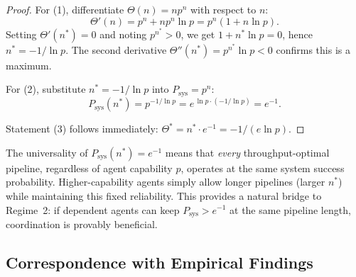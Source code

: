 \begin{proof}
For (1), differentiate $\Theta(n) = n p^n$ with respect to $n$:
\[
  \Theta'(n) = p^n + n p^n \ln p = p^n(1 + n \ln p).
\]
Setting $\Theta'(n^*) = 0$ and noting $p^{n^*} > 0$, we get $1 + n^* \ln p = 0$,
hence $n^* = -1/\ln p$. The second derivative $\Theta''(n^*) = p^{n^*} \ln p < 0$
confirms this is a maximum.

For (2), substitute $n^* = -1/\ln p$ into $P_{\mathrm{sys}} = p^n$:
\[
  P_{\mathrm{sys}}(n^*) = p^{-1/\ln p} = e^{\,\ln p \cdot (-1/\ln p)} = e^{-1}.
\]

Statement (3) follows immediately: $\Theta^* = n^* \cdot e^{-1} = -1/(e \ln p)$.
\end{proof}

\begin{remark}
The universality of $P_{\mathrm{sys}}(n^*) = e^{-1}$ means that \emph{every} throughput-optimal
pipeline, regardless of agent capability $p$, operates at the same system success probability.
Higher-capability agents simply allow longer pipelines (larger $n^*$) while maintaining
this fixed reliability. This provides a natural bridge to Regime~2: if dependent agents
can keep $P_{\mathrm{sys}} > e^{-1}$ at the same pipeline length, coordination is provably beneficial.
\end{remark}

\subsection{Correspondence with Empirical Findings}


